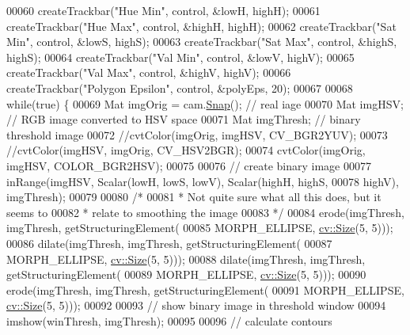 \begin{DoxyCode}
00060     createTrackbar(\textcolor{stringliteral}{"Hue Min"}, control, &lowH, highH);
00061     createTrackbar(\textcolor{stringliteral}{"Hue Max"}, control, &highH, highH);
00062     createTrackbar(\textcolor{stringliteral}{"Sat Min"}, control, &lowS, highS);
00063     createTrackbar(\textcolor{stringliteral}{"Sat Max"}, control, &highS, highS);
00064     createTrackbar(\textcolor{stringliteral}{"Val Min"}, control, &lowV, highV);
00065     createTrackbar(\textcolor{stringliteral}{"Val Max"}, control, &highV, highV);
00066     createTrackbar(\textcolor{stringliteral}{"Polygon Epsilon"}, control, &polyEps, 20);
00067 
00068     \textcolor{keywordflow}{while}(\textcolor{keyword}{true}) \{
00069         Mat imgOrig = cam.\hyperlink{classChipChipArray_1_1PiCamera_a58fb0de02570dce9a9cb60a1a04fb84f}{Snap}();  \textcolor{comment}{// real iage}
00070         Mat imgHSV;  \textcolor{comment}{// RGB image converted to HSV space}
00071         Mat imgThresh;  \textcolor{comment}{// binary threshold image}
00072         \textcolor{comment}{//cvtColor(imgOrig, imgHSV, CV\_BGR2YUV);}
00073         \textcolor{comment}{//cvtColor(imgHSV, imgOrig, CV\_HSV2BGR);}
00074         cvtColor(imgOrig, imgHSV, COLOR\_BGR2HSV);
00075 
00076         \textcolor{comment}{// create binary image}
00077         inRange(imgHSV, Scalar(lowH, lowS, lowV), Scalar(highH, highS,
00078                     highV), imgThresh);
00079 
00080         \textcolor{comment}{/* }
00081 \textcolor{comment}{         * Not quite sure what all this does, but it seems to}
00082 \textcolor{comment}{         * relate to smoothing the image}
00083 \textcolor{comment}{         */}
00084         erode(imgThresh, imgThresh, getStructuringElement(
00085                     MORPH\_ELLIPSE, \hyperlink{definitions_8hpp_a9809446fd16a744b6df9808293f14153}{cv::Size}(5, 5)));
00086         dilate(imgThresh, imgThresh, getStructuringElement(
00087                     MORPH\_ELLIPSE, \hyperlink{definitions_8hpp_a9809446fd16a744b6df9808293f14153}{cv::Size}(5, 5)));
00088         dilate(imgThresh, imgThresh, getStructuringElement(
00089                     MORPH\_ELLIPSE, \hyperlink{definitions_8hpp_a9809446fd16a744b6df9808293f14153}{cv::Size}(5, 5)));
00090         erode(imgThresh, imgThresh, getStructuringElement(
00091                     MORPH\_ELLIPSE, \hyperlink{definitions_8hpp_a9809446fd16a744b6df9808293f14153}{cv::Size}(5, 5)));
00092 
00093         \textcolor{comment}{// show binary image in threshold window}
00094         imshow(winThresh, imgThresh);
00095 
00096         \textcolor{comment}{// calculate contours}

\end{DoxyCode}
